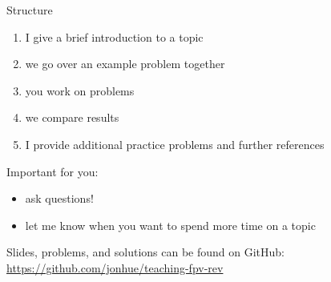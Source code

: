 \documentclass{beamer}
\begin{document}
\begin{frame}{Structure}

\begin{enumerate}
    \item I give a brief introduction to a topic
    \item we go over an example problem together
    \item you work on problems
    \item we compare results
    \item I provide additional practice problems and further references
\end{enumerate}

\vskip 1cm
\pause

Important for you:
\begin{itemize}
    \item ask questions!
    \item let me know when you want to spend more time on a topic
\end{itemize}

\vskip 1cm
\pause

Slides, problems, and solutions can be found on GitHub:
\url{https://github.com/jonhue/teaching-fpv-rev}

\end{frame}
\end{document}
